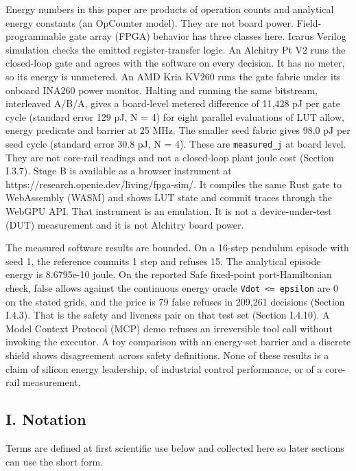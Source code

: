 \documentclass[
  10pt,
]{article}
\begin{document}
Energy numbers in this paper are products of operation counts and
analytical energy constants (an OpCounter model). They are not board
power. Field-programmable gate array (FPGA) behavior has three classes
here. Icarus Verilog simulation checks the emitted register-transfer
logic. An Alchitry Pt V2 runs the closed-loop gate and agrees with the
software on every decision. It has no meter, so its energy is unmetered.
An AMD Kria KV260 runs the gate fabric under its onboard INA260 power
monitor. Halting and running the same bitstream, interleaved A/B/A,
gives a board-level metered difference of 11,428 pJ per gate cycle
(standard error 129 pJ, N = 4) for eight parallel evaluations of LUT
allow, energy predicate and barrier at 25 MHz. The smaller seed fabric
gives 98.0 pJ per seed cycle (standard error 30.8 pJ, N = 4). These are
\texttt{measured\_j} at board level. They are not core-rail readings and
not a closed-loop plant joule cost (Section I.3.7). Stage B is available
as a browser instrument at https://research.openie.dev/living/fpga-sim/.
It compiles the same Rust gate to WebAssembly (WASM) and shows LUT state
and commit traces through the WebGPU API. That instrument is an
emulation. It is not a device-under-test (DUT) measurement and it is not
Alchitry board power.

The measured software results are bounded. On a 16-step pendulum episode
with seed 1, the reference commits 1 step and refuses 15. The analytical
episode energy is 8.6795e-10 joule. On the reported Safe fixed-point
port-Hamiltonian check, false allows against the continuous energy
oracle \texttt{Vdot\ \textless{}=\ epsilon} are 0 on the stated grids,
and the price is 79 false refuses in 209,261 decisions (Section I.4.3).
That is the safety and liveness pair on that test set (Section I.4.10).
A Model Context Protocol (MCP) demo refuses an irreversible tool call
without invoking the executor. A toy comparison with an energy-set
barrier and a discrete shield shows disagreement across safety
definitions. None of these results is a claim of silicon energy
leadership, of industrial control performance, or of a core-rail
measurement.

\subsection{I. Notation}\label{i.-notation}

Terms are defined at first scientific use below and collected here so
later sections can use the short form.
\end{document}
